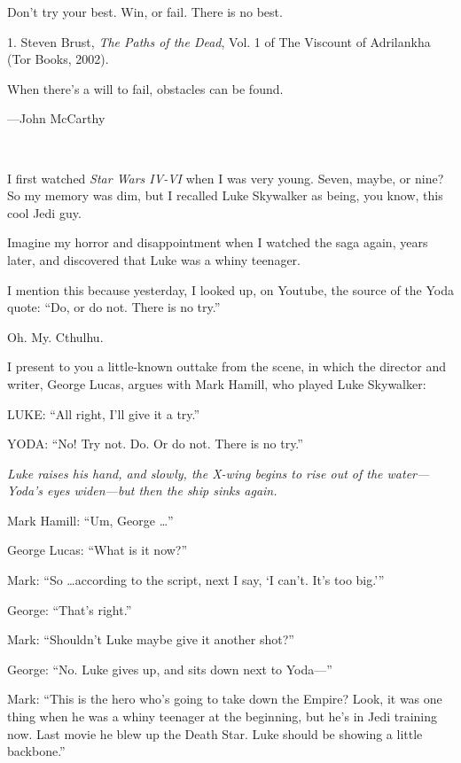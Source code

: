 {
 Don't try your best. Win, or fail. There is no
best.}

\myendsectiontext


\bigskip

{
 1. Steven Brust, \textit{The Paths of the Dead}, Vol. 1 of The
Viscount of Adrilankha (Tor Books, 2002).}


{
 When there's a will to fail, obstacles can be
found.}

{\raggedleft
 {}---John McCarthy
\par}


\bigskip

{
 ~}

{
 I first watched \textit{Star Wars IV-VI} when I was very young.
Seven, maybe, or nine? So my memory was dim, but I recalled Luke
Skywalker as being, you know, this cool Jedi guy.}

{
 Imagine my horror and disappointment when I watched the saga
again, years later, and discovered that Luke was a whiny teenager.}

{
 I mention this because yesterday, I looked up, on Youtube, the
source of the Yoda quote: ``Do, or do not. There is no
try.''}

{
 Oh. My. Cthulhu.}

{
 I present to you a little-known outtake from the scene, in which
the director and writer, George Lucas, argues with Mark Hamill, who
played Luke Skywalker:}

{
 LUKE: ``All right, I'll give it a
try.''}

{
 YODA: ``No! Try not. Do. Or do not. There is no
try.''}

{
 \textit{Luke raises his hand, and slowly, the X-wing begins to
rise out of the water---Yoda's eyes widen---but then
the ship sinks again.}}

{
 Mark Hamill: ``Um, George
\ldots''}

{
 George Lucas: ``What is it
now?''}

{
 Mark: ``So \ldots according to the script, next I
say, `I can't. It's too
big.'''}

{
 George: ``That's
right.''}

{
 Mark: ``Shouldn't Luke maybe give
it another shot?''}

{
 George: ``No. Luke gives up, and sits down next
to Yoda---''}

{
 Mark: ``This is the hero who's
going to take down the Empire? Look, it was one thing when he was a
whiny teenager at the beginning, but he's in Jedi
training now. Last movie he blew up the Death Star. Luke should be
showing a little backbone.''}

